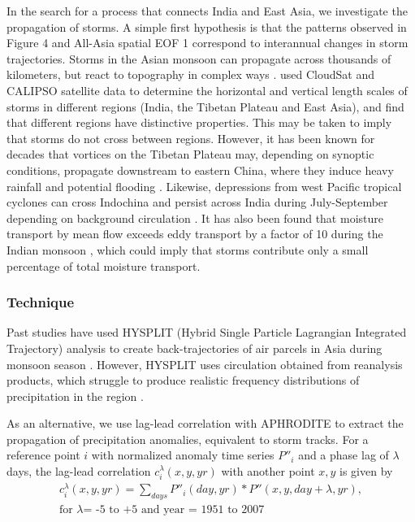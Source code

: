 \documentclass[12pt]{article}
\begin{document}
	In the search for a process that connects India and East Asia, we investigate the propagation of storms. A simple first hypothesis is that the patterns observed in Figure 4 and All-Asia spatial EOF 1 correspond to interannual changes in storm trajectories. Storms in the Asian monsoon can propagate across thousands of kilometers, but react to topography in complex ways \citep{Romatschke2011a}. \cite{Luo2011} used CloudSat and CALIPSO satellite data to determine the horizontal and vertical length scales of storms in different regions (India, the Tibetan Plateau and East Asia), and find that different regions have distinctive properties. This may be taken to imply that storms do not cross between regions. However, it has been known for decades that vortices on the Tibetan Plateau may, depending on synoptic conditions, propagate downstream to eastern China, where they induce heavy rainfall and potential flooding \citep{Tao1981,Murakami1984,Chen1984,Yasunari2006,Xu2011,Wang2012a}. Likewise, depressions from west Pacific tropical cyclones can cross Indochina and persist across India during July-September depending on background circulation \citep{Chen1999,Fudeyasu2006}. It has also been found that moisture transport by mean flow exceeds eddy transport by a factor of 10 during the Indian monsoon \citep{Feng2012}, which could imply that storms contribute only a small percentage of total moisture transport. 
	

\subsubsection{Technique}

	Past studies have used HYSPLIT (Hybrid Single Particle Lagrangian Integrated Trajectory) analysis to create back-trajectories of air parcels in Asia during monsoon season \citep{Medina2010,Cai2012,Gao2013}. However, HYSPLIT uses circulation obtained from reanalysis products, which struggle to produce realistic frequency distributions of precipitation in the region \citep{Pena-Arancibia2013}. 
	
	As an alternative, we use lag-lead correlation with APHRODITE to extract the propagation of precipitation anomalies, equivalent to storm tracks.  For a reference point $i$ with normalized anomaly time series $P''_i$ and a phase lag of $\lambda$ days, the lag-lead correlation $c_i^\lambda(x,y,yr)$ with another point $x,y$ is given by
\begin{gather*}
	c_i^\lambda(x,y,yr)=\sum_{days}P''_i(day,yr)*P''(x,y,day+\lambda,yr),\\
	\text{for } \lambda \text{= -5 to +5 and year = 1951 to 2007}
\end{gather*}
	
\end{document}
